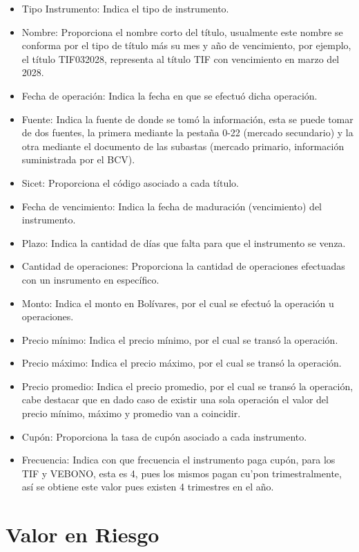\documentclass[
  12pt,
]{krantz}
\providecommand{\tightlist}{%
  \setlength{\itemsep}{0pt}\setlength{\parskip}{0pt}}
\begin{document}
\begin{itemize}
\tightlist
\item
  Tipo Instrumento: Indica el tipo de instrumento.
\item
  Nombre: Proporciona el nombre corto del título, usualmente este nombre se conforma por el tipo de título más su mes y año de vencimiento, por ejemplo, el título TIF032028, representa al título TIF con vencimiento en marzo del 2028.
\item
  Fecha de operación: Indica la fecha en que se efectuó dicha operación.
\item
  Fuente: Indica la fuente de donde se tomó la información, esta se puede tomar de dos fuentes, la primera mediante la pestaña 0-22 (mercado secundario) y la otra mediante el documento de las subastas (mercado primario, información suministrada por el BCV).
\item
  Sicet: Proporciona el código asociado a cada título.
\item
  Fecha de vencimiento: Indica la fecha de maduración (vencimiento) del instrumento.
\item
  Plazo: Indica la cantidad de días que falta para que el instrumento se venza.
\item
  Cantidad de operaciones: Proporciona la cantidad de operaciones efectuadas con un insrumento en específico.
\item
  Monto: Indica el monto en Bolívares, por el cual se efectuó la operación u operaciones.
\item
  Precio mínimo: Indica el precio mínimo, por el cual se transó la operación.
\item
  Precio máximo: Indica el precio máximo, por el cual se transó la operación.
\item
  Precio promedio: Indica el precio promedio, por el cual se transó la operación, cabe destacar que en dado caso de existir una sola operación el valor del precio mínimo, máximo y promedio van a coincidir.
\item
  Cupón: Proporciona la tasa de cupón asociado a cada instrumento.
\item
  Frecuencia: Indica con que frecuencia el instrumento paga cupón, para los TIF y VEBONO, esta es 4, pues los mismos pagan cu'pon trimestralmente, así se obtiene este valor pues existen 4 trimestres en el año.
\end{itemize}

\mainmatter

\hypertarget{valor-en-riesgo}{%
\chapter{Valor en Riesgo}\label{valor-en-riesgo}}
\end{document}
